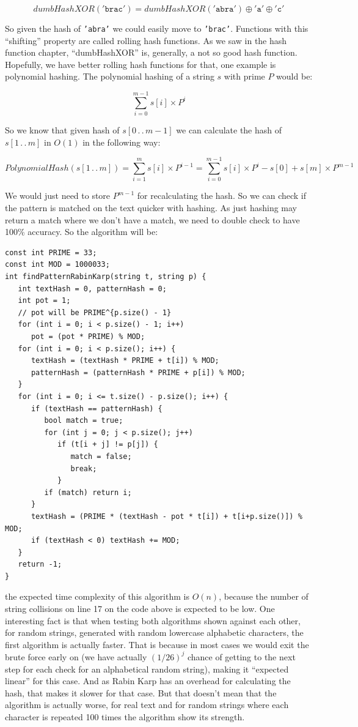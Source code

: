 \[ dumbHashXOR(\mathtt{'brac'}) = dumbHashXOR(\mathtt{'abra'}) \oplus \mathtt{'a'} \oplus \mathtt{'c'} \]

So given the hash of \texttt{'abra'} we could easily move to \texttt{'brac'}. Functions with this ``shifting'' property are called rolling hash functions. As we saw in the hash function chapter, ``dumbHashXOR'' is, generally, a not so good hash function. Hopefully, we have better rolling hash functions for that, one example is polynomial hashing. The polynomial hashing of a string \( s \) with prime \( P \) would be:

\[ \sum_{i=0}^{m-1}s[i] \times P^{i} \]

So we know that given hash of \( s[0\,.\,.\,m{-}1] \) we can calculate the hash of \( s[1\,.\,.\,m] \) in \( O(1) \) in the following way:

\[ PolynomialHash(s[1\,.\,.\,m]) = \sum_{i=1}^{m}s[i] \times P^{i-1} = \sum_{i=0}^{m-1}s[i] \times P^{i} - s[0] + s[m] \times P^{m-1} \]

We would just need to store \( P^{m-1} \) for recalculating the hash. So we can check if the pattern is matched on the text quicker with hashing. As just hashing may return a match where we don't have a match, we need to double check to have 100\% accuracy. So the algorithm will be:

\newpage

\begin{lstlisting}
const int PRIME = 33;
const int MOD = 1000033;
int findPatternRabinKarp(string t, string p) {
   int textHash = 0, patternHash = 0;
   int pot = 1;
   // pot will be PRIME^{p.size() - 1}
   for (int i = 0; i < p.size() - 1; i++)
      pot = (pot * PRIME) % MOD;
   for (int i = 0; i < p.size(); i++) {
      textHash = (textHash * PRIME + t[i]) % MOD;
      patternHash = (patternHash * PRIME + p[i]) % MOD;
   }
   for (int i = 0; i <= t.size() - p.size(); i++) {
      if (textHash == patternHash) {
         bool match = true;
         for (int j = 0; j < p.size(); j++)
            if (t[i + j] != p[j]) {
               match = false;
               break;
            }
         if (match) return i;
      }
      textHash = (PRIME * (textHash - pot * t[i]) + t[i+p.size()]) % MOD;
      if (textHash < 0) textHash += MOD;
   }
   return -1;
}
\end{lstlisting}

the expected time complexity of this algorithm is \( O(n) \), because the number of string collisions on line 17 on the code above is expected to be low. One interesting fact is that when testing both algorithms shown against each other, for random strings, generated with random lowercase alphabetic characters, the first algorithm is actually faster. That is because in most cases we would exit the brute force early on (we have actually \( (1/26)^j \) chance of getting to the next step for each check for an alphabetical random string), making it ``expected linear'' for this case. And as Rabin Karp has an overhead for calculating the hash, that makes it slower for that case. But that doesn't mean that the algorithm is actually worse, for real text and for random strings where each character is repeated 100 times the algorithm show its strength.


